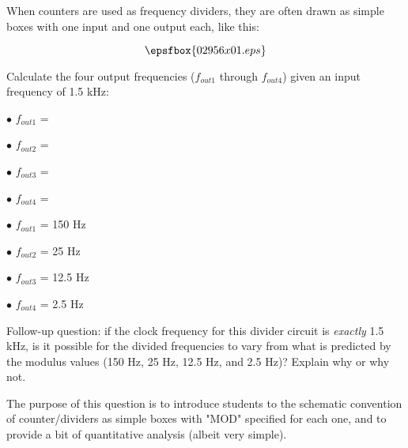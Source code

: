 

When counters are used as frequency dividers, they are often drawn as simple boxes with one input and one output each, like this:

$$\epsfbox{02956x01.eps}$$

Calculate the four output frequencies ($f_{out1}$ through $f_{out4}$) given an input frequency of 1.5 kHz:

\medskip
\goodbreak
\item{$\bullet$} $f_{out1}$ = 
\item{$\bullet$} $f_{out2}$ = 
\item{$\bullet$} $f_{out3}$ = 
\item{$\bullet$} $f_{out4}$ = 
\medskip







\medskip
\goodbreak
\item{$\bullet$} $f_{out1}$ = 150 Hz
\item{$\bullet$} $f_{out2}$ = 25 Hz
\item{$\bullet$} $f_{out3}$ = 12.5 Hz
\item{$\bullet$} $f_{out4}$ = 2.5 Hz
\medskip

\vskip 10pt

Follow-up question: if the clock frequency for this divider circuit is {\it exactly} 1.5 kHz, is it possible for the divided frequencies to vary from what is predicted by the modulus values (150 Hz, 25 Hz, 12.5 Hz, and 2.5 Hz)?  Explain why or why not.







The purpose of this question is to introduce students to the schematic convention of counter/dividers as simple boxes with "MOD" specified for each one, and to provide a bit of quantitative analysis (albeit very simple).




